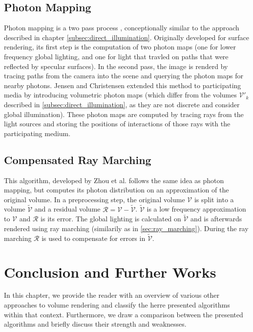 \subsection{Photon Mapping}
Photon mapping is a two pass process \cite{10.1145/280814.280925}, conceptionally similar to the approach described in chapter \ref{subsec:direct_illumination}. Originally developed for surface rendering\cite{10.5555/275458.275461}, its first step is the computation of two photon maps\cite{10.1145/280814.280925} (one for lower frequency global lighting, and one for light that travled on paths that were reflected by specular surfaces). In the second pass, the image is renderd by tracing paths from the camera into the scene and querying the photon maps for nearby photons.
Jensen and Christensen \cite{10.1145/280814.280925} extended this method to participating media by introducing volumetric photon maps (which differ from the volumes $\mathcal{V}'_k$ described in \ref{subsec:direct_illumination}, as they are not discrete and consider global illumination). These photon maps are computed by tracing rays from the light sources and storing the positions of interactions of those rays with the participating medium.
\subsection{Compensated Ray Marching}
This algorithm, developed by Zhou et al. \cite{zhou2007real-time} follows the same idea as photon mapping, but computes its photon distribution on an approximation of the original volume.
In a preprocessing step, the original volume $\mathcal{V}$ is split into a volume $\widetilde{\mathcal{V}}$ and a residual volume $\mathcal{R} = \mathcal{V} - \widetilde{\mathcal{V}}$. $\widetilde{\mathcal{V}}$ is a low frequency approximation to $\mathcal{V}$ and $\mathcal{R}$ is its error. The global lighting is calculated on $\widetilde{\mathcal{V}}$ and is afterwards rendered using ray marching (similarily as in \ref{sec:ray_marching}). During the ray marching $\mathcal{R}$ is used to compensate for errors in $\widetilde{\mathcal{V}}$.
\section{Conclusion and Further Works}
\label{sec:conclusion}
In this chapter, we provide the reader with an overview of various other approaches to volume rendering and classify the herre presented algorithms within that context. Furthermore, we draw a comparison between the presented algorithms and briefly discuss their strength and weaknesses.
